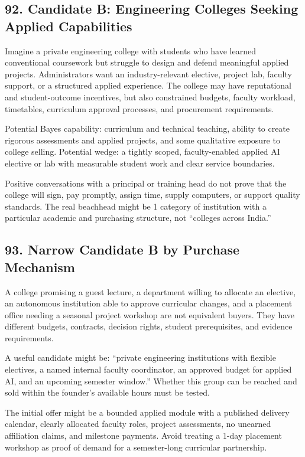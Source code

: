 \subsection*{92. Candidate B: Engineering Colleges Seeking Applied Capabilities}

Imagine a private engineering college with students who have learned conventional coursework but struggle to design and defend meaningful applied projects. Administrators want an industry-relevant elective, project lab, faculty support, or a structured applied experience. The college may have reputational and student-outcome incentives, but also constrained budgets, faculty workload, timetables, curriculum approval processes, and procurement requirements.

Potential Bayes capability: curriculum and technical teaching, ability to create rigorous assessments and applied projects, and some qualitative exposure to college selling. Potential wedge: a tightly scoped, faculty-enabled applied AI elective or lab with measurable student work and clear service boundaries.

Positive conversations with a principal or training head do not prove that the college will sign, pay promptly, assign time, supply computers, or support quality standards. The real beachhead might be 1 category of institution with a particular academic and purchasing structure, not ``colleges across India.''

\subsection*{93. Narrow Candidate B by Purchase Mechanism}

A college promising a guest lecture, a department willing to allocate an elective, an autonomous institution able to approve curricular changes, and a placement office needing a seasonal project workshop are not equivalent buyers. They have different budgets, contracts, decision rights, student prerequisites, and evidence requirements.

A useful candidate might be: ``private engineering institutions with flexible electives, a named internal faculty coordinator, an approved budget for applied AI, and an upcoming semester window.'' Whether this group can be reached and sold within the founder's available hours must be tested.

The initial offer might be a bounded applied module with a published delivery calendar, clearly allocated faculty roles, project assessments, no unearned affiliation claims, and milestone payments. Avoid treating a 1-day placement workshop as proof of demand for a semester-long curricular partnership.

